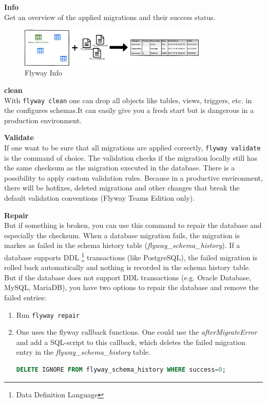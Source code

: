 \textbf{Info}\\
Get an overview of the applied migrations and their success status.\\

\begin{figure}[H]
	\centering
	\includegraphics[width=0.8\textwidth]{./chapters/intro_flyway/images/command-info}
	\caption[Flyway Info - Source: \cite{FlywayGetStarted}]{Flyway Info}
	\label{fig:command-info}
\end{figure}


\textbf{clean}\\
With \texttt{flyway clean} one can drop all objects like tables, views, triggers, etc. in the configures schemas.It can easily give you a fresh start but is dangerous in a production environment.

\textbf{Validate}\\
If one want to be sure that all migrations are applied correctly,  \texttt{flyway validate} is the command of choice. The validation checks if the migration locally still has the same checksum as the migration executed in the database.
There is a possibility to apply custom validation rules. Because in a productive environment, there will be hotfixes, deleted migrations and other changes that break the default validation conventions (Flyway Teams Edition only).

\textbf{Repair}\\
But if something is broken, you can use this command to repair the database and especially the checksum. When a database migration fails, the migration is markes as failed in the schema history table (\textit{flyway\_schema\_history}). If a database supports DDL \footnote{Data Definition Language} transactions (like PostgreSQL), the failed migration is rolled back automatically and nothing is recorded in the schema history table.  But if the database does not support DDL transactions (e.g. Oracle Database, MySQL, MariaDB), you have two options to repair the database and remove the failed entries:

\begin{enumerate}
	\item Run \texttt{flyway repair}\\
	\item One uses the flyway callback functions. One could use the \textit{afterMigrateError} and add a SQL-script to this callback, which deletes the failed migration entry in the \textit{flyway\_schema\_history} table.
	
	\begin{lstlisting}[language=SQL]
		DELETE IGNORE FROM flyway_schema_history WHERE success=0;
	\end{lstlisting}
\end{enumerate}



